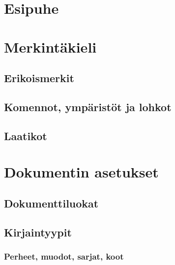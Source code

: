 \documentclass[a4paper,10pt,notitlepage,oneside]{book}
\begin{document}
\pagestyle{empty}


{
  \renewcommand{\thispagestyle}[1]{}
}

\clearpage
\pagestyle{plain}

\chapter*{Esipuhe}





\chapter{Merkintäkieli}
\section{Erikoismerkit}
\section{Komennot, ympäristöt ja lohkot}
\section{Laatikot}

\chapter{Dokumentin asetukset}
\section{Dokumenttiluokat}
\label{luku:dokumenttiluokat}
\section{Kirjaintyypit}
\label{luku:kirjaintyypit}

\subsection{Perheet, muodot, sarjat, koot}
\end{document}
